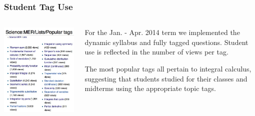\documentclass{beamer}
\begin{document}
\frame
{\frametitle{\bf{Student Tag Use}}
\begin{columns}
\begin{column}{0.6\textwidth}
\includegraphics[width=\textwidth]{popular_tags2.jpg}
\end{column}
\begin{column}{0.4\textwidth}
For the Jan. - Apr. 2014 term we implemented the dynamic syllabus and fully tagged questions. Student use is reflected in the number of views per tag.

\medskip

The most popular tags all pertain to integral calculus, suggesting that students studied for their classes and midterms using the appropriate topic tags.
\end{column}
\end{columns}
}
\end{document}
